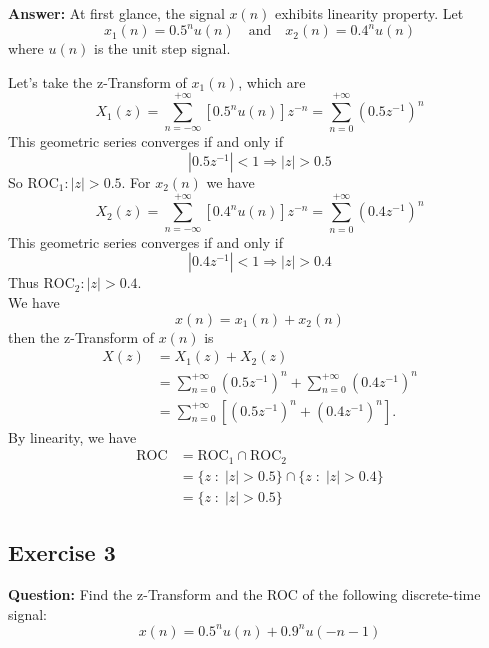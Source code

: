 \documentclass[12pt,a4paper]{article}
\begin{document}
\noindent\textbf{Answer:} At first glance, the signal $x(n)$ exhibits linearity property. Let
\begin{equation*}
    x_1(n)=0.5^n u(n) \quad \text{and} \quad x_2(n)=0.4^n u(n)
\end{equation*}
where $u(n)$ is the unit step signal.\\[0.5ex]
\par Let's take the z-Transform of $x_1(n)$, which are
\begin{equation*}
    X_1(z) = \sum_{n=-\infty}^{+\infty} \left[0.5^n u(n)\right]z^{-n}
    = \sum_{n=0}^{+\infty} \left(0.5z^{-1}\right)^n
\end{equation*}
This geometric series converges if and only if
\begin{equation*}
    |0.5z^{-1}|<1\Rightarrow |z|>0.5
\end{equation*}
So $\text{ROC}_1:|z|>0.5$. For $x_2(n)$ we have
\begin{equation*}
    X_2(z) = \sum_{n=-\infty}^{+\infty} \left[0.4^n u(n)\right]z^{-n}
    = \sum_{n=0}^{+\infty} \left(0.4z^{-1}\right)^n
\end{equation*}
This geometric series converges if and only if
\begin{equation*}
    |0.4z^{-1}|<1\Rightarrow |z|>0.4
\end{equation*}
Thus $\text{ROC}_2:|z|>0.4$.\\[0.5ex]
We have
\begin{equation*}
    x(n) = x_1(n) + x_2(n)
\end{equation*}
then the z-Transform of $x(n)$ is
\begin{align*}
    X(z) &= X_1(z) + X_2(z)\\
    &= \sum_{n=0}^{+\infty} \left(0.5z^{-1}\right)^n+\sum_{n=0}^{+\infty} \left(0.4z^{-1}\right)^n\\
    &= \sum_{n=0}^{+\infty} \left[\left(0.5z^{-1}\right)^n+\left(0.4z^{-1}\right)^n\right].
\end{align*}
By linearity, we have
\begin{align*}
    \text{ROC} &= \text{ROC}_1 \cap \text{ROC}_2\\
    &= \{z\; : \; |z|>0.5\}\cap\{z\; : \; |z|>0.4\}\\
    &= \{z\; : \; |z|>0.5\}
\end{align*}
\subsection{Exercise 3}\label{sec:ex3}
\noindent\textbf{Question:}
Find the z-Transform and the ROC of the following discrete-time signal:
\[
x(n) = 0.5^n u(n) + 0.9^n u(-n - 1)
\]
\end{document}

